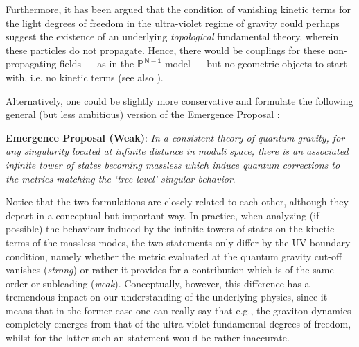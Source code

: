 Furthermore, it has been argued \cite{Palti:2019pca,Harlow:2015lma,Grimm:2018ohb} that the condition of vanishing kinetic terms for the light degrees of freedom in the ultra-violet regime of gravity could perhaps suggest the existence of an underlying \emph{topological} fundamental theory, wherein these particles do not propagate. %
Hence, there would be couplings for these non-propagating fields --- as in the $\mathbb{P}^{\,\mathsf{N-1}}$ model --- but no geometric objects to start with, i.e. no kinetic terms (see also \cite{Harlow:2015lma,Agrawal:2020xek}). 

Alternatively, one could be slightly more conservative and formulate the following general (but less ambitious) version of the Emergence Proposal \cite{Heidenreich:2017sim,Heidenreich:2018kpg}:

\begin{center}
	\textbf{Emergence Proposal (Weak)}: \textit{In a consistent theory of quantum gravity, for any singularity located at infinite distance in moduli space, there is an associated infinite tower of states becoming massless which induce quantum corrections to the metrics matching the `tree-level' singular behavior}. 
\end{center}
	
Notice that the two formulations are closely related to each other, although they depart in a conceptual but important way. In practice, when analyzing (if possible) the behaviour induced by the infinite towers of states on the kinetic terms of the massless modes, the two statements only differ by the UV boundary condition, namely whether the metric evaluated at the quantum gravity cut-off vanishes (\emph{strong}) or rather it provides for a contribution which is of the same order or subleading (\emph{weak}). Conceptually, however, this difference has a tremendous impact on our understanding of the underlying physics, since it means that in the former case one can really say that e.g., the graviton dynamics completely emerges from that of the ultra-violet fundamental degrees of freedom, whilst for the latter such an statement would be rather inaccurate.

